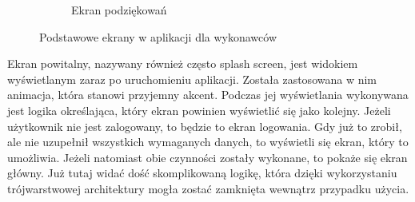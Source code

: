 \begin{figure}[ht]
\begin{subfigure}{0.32\textwidth}
    \caption{Ekran podziękowań}
  \end{subfigure}
  \caption[Podstawowe ekrany]{Podstawowe ekrany w aplikacji dla wykonawców}
  \label{fig:basic-expert}
\end{figure}

Ekran powitalny, nazywany również często splash screen, jest widokiem wyświetlanym zaraz po uruchomieniu aplikacji. Została zastosowana w nim animacja, która stanowi przyjemny akcent. Podczas jej wyświetlania wykonywana jest logika określająca, który ekran powinien wyświetlić się jako kolejny. Jeżeli użytkownik nie jest zalogowany, to będzie to ekran logowania. Gdy już to zrobił, ale nie uzupełnił wszystkich wymaganych danych, to wyświetli się ekran, który to umożliwia. Jeżeli natomiast obie czynności zostały wykonane, to pokaże się ekran główny. Już tutaj widać dość skomplikowaną logikę, która dzięki wykorzystaniu trójwarstwowej architektury mogła zostać zamknięta wewnątrz przypadku użycia.

